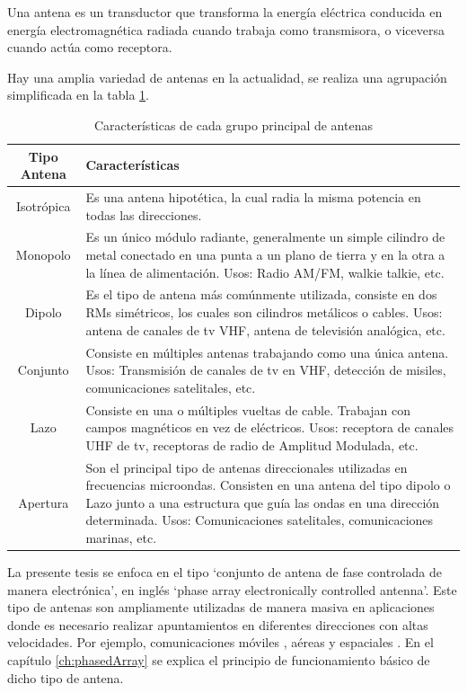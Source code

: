 Una antena es un transductor que transforma la energía eléctrica conducida en energía electromagnética radiada cuando
trabaja como transmisora, o viceversa cuando actúa como receptora.

Hay una amplia variedad de antenas en la actualidad, se realiza una agrupación simplificada en la tabla \ref{tab:type_antennas}.

\begin{table}[H]
  \footnotesize
  \centering
  \begin{tabular}{|c|p{9cm}|}
	\hline
	\textbf{Tipo Antena} & \textbf{Características} \\\hline
	Isotrópica & Es una antena hipotética, la cual radia la misma potencia en todas las direcciones.\\\hline
	Monopolo & Es un único módulo radiante, generalmente un simple cilindro de metal conectado en una punta a un plano de
	tierra y en la otra a la línea de alimentación. Usos: Radio AM/FM, walkie talkie, etc. \\\hline
	Dipolo & Es el tipo de antena más comúnmente utilizada, consiste en dos RMs simétricos, los cuales son cilindros
	metálicos o cables. Usos: antena de canales de tv VHF, antena de televisión analógica, etc. \\\hline
	Conjunto & Consiste en múltiples antenas trabajando como una única antena. Usos: Transmisión de canales de tv en VHF,
	detección de misiles, comunicaciones satelitales, etc.\\\hline
	Lazo & Consiste en una o múltiples vueltas de cable. Trabajan con campos magnéticos en vez de eléctricos. Usos: receptora
	de canales UHF de tv, receptoras de radio de Amplitud Modulada, etc.\\\hline
	Apertura & Son el principal tipo de antenas direccionales utilizadas en frecuencias microondas. Consisten en una antena
	del tipo dipolo o Lazo junto a una estructura que guía las ondas en una dirección determinada. Usos: Comunicaciones
	satelitales, comunicaciones marinas, etc.\\\hline
  \end{tabular}
  \caption{Características de cada grupo principal de antenas}
  \label{tab:type_antennas}
\end{table}

La presente tesis se enfoca en el tipo \enquote*{conjunto de antena de fase controlada de manera electrónica}, en inglés
\enquote*{phase array electronically controlled antenna}. Este tipo de antenas son ampliamente utilizadas de manera masiva
en aplicaciones donde es necesario realizar apuntamientos en diferentes direcciones con altas velocidades. Por ejemplo,
comunicaciones móviles \cite{Chen2012}, aéreas \cite{MHong1989} y espaciales \cite{Shimada1995}\cite{Makhoul2012}. En el capítulo
\ref{ch:phasedArray} se explica el principio de funcionamiento básico de dicho tipo de antena.

